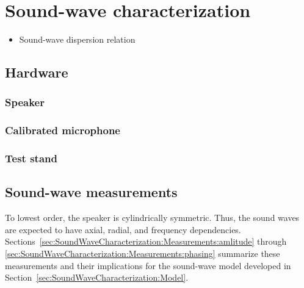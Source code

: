 \chapter{Sound-wave characterization}
\label{app:SoundWaveCharacterization}
\begin{itemize}
  \item Sound-wave dispersion relation
\end{itemize}


\section{Hardware}
\label{sec:SoundWaveCharacterization:Hardware}
\subsection{Speaker}
\label{sec:SoundWaveCharacterization:Hardware:speaker}
\subsection{Calibrated microphone}
\label{sec:SoundWaveCharacterization:Hardware:microphone}
\subsection{Test stand}
\label{sec:SoundWaveCharacterization:Hardware:test_stand}


\section{Sound-wave measurements}
\label{sec:SoundWaveCharacterization:Measurements}
To lowest order, the speaker is cylindrically symmetric.
Thus, the sound waves are expected to have
axial, radial, and frequency dependencies.
Sections~\ref{sec:SoundWaveCharacterization:Measurements:amlitude} through
\ref{sec:SoundWaveCharacterization:Measurements:phasing}
summarize these measurements and their implications
for the sound-wave model developed in
Section~\ref{sec:SoundWaveCharacterization:Model}.


